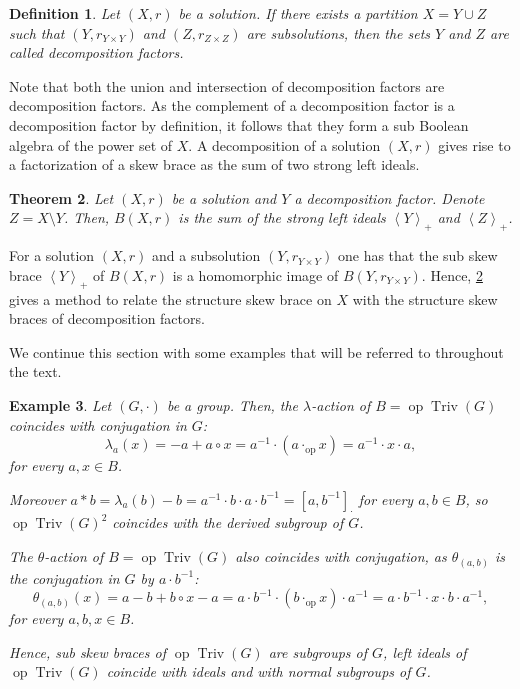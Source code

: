 \documentclass{amsart}
\newcommand{\Triv}{\operatorname{Triv}}
\newcommand{\op}{\operatorname{op}}
\newtheorem{thm}{Theorem}[section]
\newtheorem{defn}[thm]{Definition}
\newtheorem{exa}[thm]{Example}
\begin{document}
\begin{defn}
    Let $(X,r)$ be a solution. If there exists a partition $X=Y \cup Z$ such that $ (Y,r_{Y\times Y})$ and $(Z, r_{Z \times Z})$ are subsolutions, then the sets $Y$ and $Z$ are called \emph{decomposition factors}.
\end{defn}

Note that both the union and intersection of decomposition factors are decomposition factors.
As the complement of a decomposition factor is a decomposition factor by definition,
it follows that they form a sub Boolean algebra of the power set of $X$. 
A decomposition of a solution $(X,r)$ gives rise to a factorization of a skew brace as the sum of two strong left ideals.

\begin{thm}\label{decompgivesfactorization}
    Let $(X,r)$ be a solution and $Y$ a decomposition factor. Denote $Z=X \setminus Y$. Then, $B(X,r)$ is the sum of the strong left ideals $\left<Y\right>_+$ and $\left<Z\right>_+$.
\end{thm}
For a solution $(X,r)$ and a subsolution $(Y,r_{Y \times Y})$ one has that the sub skew brace $\left< Y \right>_+$ of $B(X,r)$ is a homomorphic image of $B(Y,r_{Y\times Y})$. Hence, \cref{decompgivesfactorization} gives a method to relate the structure skew brace on $X$ with the structure skew braces of decomposition factors.

We continue this section with some examples that will be referred to throughout the text.

\begin{exa}\label{exaoptriv}
Let $(G,\cdot)$ be a group. Then, the $\lambda$-action of $B=\op\Triv(G)$ coincides with conjugation in $G$:
\[
\lambda_a(x)=-a+a\circ x=a^{-1}\cdot (a\cdot_{\op} x)=a^{-1} \cdot x\cdot a,
\]
for every $a,x\in B$.

Moreover $a*b=\lambda_a(b)-b=a^{-1} \cdot b\cdot a\cdot b^{-1}=[a,b^{-1}]_\cdot$ for every $a,b\in B$, so
 $\op\Triv(G)^2$ coincides with the derived subgroup of $G$.
 
The $\theta$-action of $B=\op\Triv(G)$ also coincides with conjugation, as
$\theta_{(a,b)}$ is the conjugation in $G$ by $a\cdot b^{-1}$:
\[
\theta_{(a,b)}(x)=a-b+b\circ x-a=a\cdot b^{-1}\cdot (b\cdot_{\op}x)\cdot a^{-1}=a\cdot b^{-1}\cdot x\cdot b\cdot a^{-1},
\]
for every $a,b,x\in B$.

Hence, sub skew braces of $\op\Triv(G)$ are subgroups of $G$, left ideals of $\op\Triv(G)$ coincide with ideals and with normal subgroups of $G$.
\end{exa}
\end{document}
